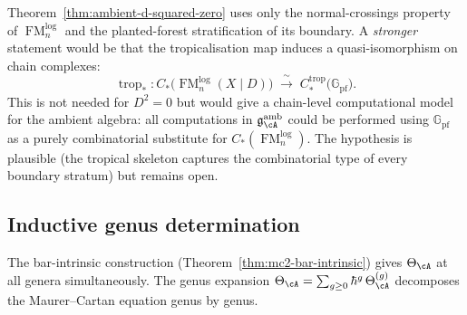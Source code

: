 \begin{remark}
\label{hyp:tropical-faithfulness}
\label{rem:tropical-faithfulness}
Theorem~\textup{\ref{thm:ambient-d-squared-zero}} uses only the
normal-crossings property of $\operatorname{FM}_n^{\mathrm{log}}$
and the planted-forest stratification of its boundary.  A
\emph{stronger} statement would be that the tropicalisation map
induces a quasi-isomorphism on chain complexes:
\begin{equation}\label{eq:log-fm-qiso-hypothesis}
\operatorname{trop}_*\colon
C_*\bigl(\operatorname{FM}_n^{\mathrm{log}}(X \mathbin{|} D)\bigr)
\;\xrightarrow{\;\sim\;}\;
C_*^{\mathrm{trop}}\bigl(\mathbb{G}_{\mathrm{pf}}\bigr).
\end{equation}
This is not needed for $D^2 = 0$ but would give a
chain-level computational model for the ambient algebra:
all computations in $\mathfrak{g}^{\mathrm{amb}}_{\cA}$ could
be performed using $\mathbb{G}_{\mathrm{pf}}$ as a purely
combinatorial substitute for $C_*(\operatorname{FM}_n^{\mathrm{log}})$.
The hypothesis is plausible (the tropical skeleton captures
the combinatorial type of every boundary stratum) but remains
open.
\end{remark}


\subsection{Inductive genus determination}
\label{subsec:inductive-genus-determination}

The bar-intrinsic construction
(Theorem~\ref{thm:mc2-bar-intrinsic})
gives $\Theta_\cA$ at all genera simultaneously.
The genus expansion
$\Theta_\cA = \sum_{g \geq 0} \hbar^g\,\Theta_\cA^{(g)}$
decomposes the Maurer--Cartan equation genus by genus.

